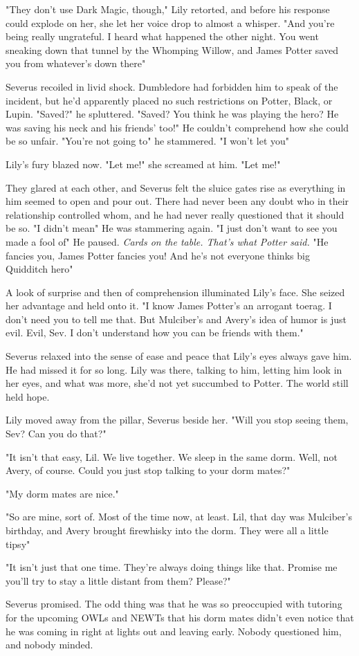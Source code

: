 "They don't use Dark Magic, though," Lily retorted, and before his response could explode on her, she let her voice drop to almost a whisper. "And you're being really ungrateful. I heard what happened the other night. You went sneaking down that tunnel by the Whomping Willow, and James Potter saved you from whatever's down there{\el}"

Severus recoiled in livid shock. Dumbledore had forbidden him to speak of the incident, but he'd apparently placed no such restrictions on Potter, Black, or Lupin. "Saved?" he spluttered. "Saved? You think he was playing the hero? He was saving his neck and his friends' too!" He couldn't comprehend how she could be so unfair. "You're not going to{\el}" he stammered. "I won't let you{\el}"

Lily's fury blazed now. "Let me!" she screamed at him. "Let me!"

They glared at each other, and Severus felt the sluice gates rise as everything in him seemed to open and pour out. There had never been any doubt who in their relationship controlled whom, and he had never really questioned that it should be so. "I didn't mean{\el}" He was stammering again. "I just don't want to{\el} see you made a fool of{\el}" He paused. \emph{Cards on the table. That's what Potter said.} "He fancies you, James Potter fancies you! And he's not{\el} everyone thinks{\el} big Quidditch hero{\el}"

A look of surprise and then of comprehension illuminated Lily's face. She seized her advantage and held onto it. "I know James Potter's an arrogant toerag. I don't need you to tell me that. But Mulciber's and Avery's idea of humor is just evil. Evil, Sev. I don't understand how you can be friends with them."

Severus relaxed into the sense of ease and peace that Lily's eyes always gave him. He had missed it for so long. Lily was there, talking to him, letting him look in her eyes, and what was more, she'd not yet succumbed to Potter. The world still held hope.

Lily moved away from the pillar, Severus beside her. "Will you stop seeing them, Sev? Can you do that?"

"It isn't that easy, Lil. We live together. We sleep in the same dorm. Well, not Avery, of course. Could you just stop talking to your dorm mates?"

"My dorm mates are nice."

"So are mine, sort of. Most of the time now, at least. Lil, that day was Mulciber's birthday, and Avery brought firewhisky into the dorm. They were all a little tipsy{\el}"

"It isn't just that one time. They're always doing things like that. Promise me you'll try to stay a little distant from them? Please?"

Severus promised. The odd thing was that he was so preoccupied with tutoring for the upcoming OWLs and NEWTs that his dorm mates didn't even notice that he was coming in right at lights out and leaving early. Nobody questioned him, and nobody minded. 


